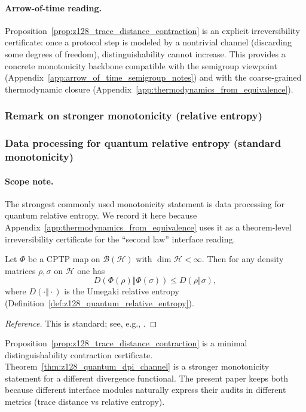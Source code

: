 \paragraph{Arrow-of-time reading.}
\InterfaceTag Proposition~\ref{prop:z128_trace_distance_contraction} is an explicit irreversibility certificate:
once a protocol step is modeled by a nontrivial channel (discarding some degrees of freedom), distinguishability cannot increase.
This provides a concrete monotonicity backbone compatible with the semigroup viewpoint (Appendix~\ref{app:arrow_of_time_semigroup_notes}) and with the coarse-grained thermodynamic closure (Appendix~\ref{app:thermodynamics_from_equivalence}).

\subsubsection{Remark on stronger monotonicity (relative entropy)}
\subsubsection{Data processing for quantum relative entropy (standard monotonicity)}
\label{subsec:z128_quantum_relative_entropy_dpi}

\paragraph{Scope note.}
\AuditTag The strongest commonly used monotonicity statement is data processing for quantum relative entropy.
We record it here because Appendix~\ref{app:thermodynamics_from_equivalence} uses it as a theorem-level irreversibility certificate for the ``second law'' interface reading.

\begin{theorem}
\label{thm:z128_quantum_dpi_channel}
\MathTag Let $\Phi$ be a CPTP map on $\mathcal{B}(\mathcal{H})$ with $\dim\mathcal{H}<\infty$.
Then for any density matrices $\rho,\sigma$ on $\mathcal{H}$ one has
\[
D(\Phi(\rho)\Vert \Phi(\sigma))\le D(\rho\Vert \sigma),
\]
where $D(\cdot\Vert\cdot)$ is the Umegaki relative entropy (Definition~\ref{def:z128_quantum_relative_entropy}).
\end{theorem}
\begin{proof}[Reference]
This is standard; see, e.g., \cite{NielsenChuang2000}.
\end{proof}

\begin{remark}
\label{rem:z128_dpi_vs_trace_distance}
\InterfaceTag Proposition~\ref{prop:z128_trace_distance_contraction} is a minimal distinguishability contraction certificate.
Theorem~\ref{thm:z128_quantum_dpi_channel} is a stronger monotonicity statement for a different divergence functional.
The present paper keeps both because different interface modules naturally express their audits in different metrics (trace distance vs relative entropy).
\end{remark}
